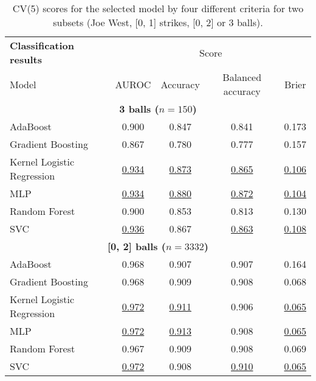 \begin{table}
\centering\small
\begin{tabular}{lcccc}
\toprule
\multicolumn{1}{l}{\textbf{Classification results}}
 & \multicolumn{4}{c}{Score}\\\cmidrule(l){2-5}
Model &  AUROC &  Accuracy &  Balanced accuracy &  Brier \\
\midrule
\multicolumn{5}{c}{\textbf{3 balls ($n=150$)}}\\\addlinespace
AdaBoost 					&  0.900 &     0.847 &              0.841 & 0.173 \\
Gradient Boosting 			&  0.867 &     0.780 &              0.777 & 0.157 \\
Kernel Logistic Regression 	&  \underline{0.934} &     \underline{0.873} &              \underline{0.865} & \underline{0.106} \\
MLP 							&  \underline{0.934} &     \underline{0.880} &              \underline{0.872} & \underline{0.104} \\
Random Forest 				&  0.900 &     0.853 &              0.813 & 0.130 \\
SVC 							&  \underline{0.936} &     0.867 &              \underline{0.863} & \underline{0.108} \\
\midrule
\multicolumn{5}{c}{\textbf{{[0, 2]} balls ($n=3332$)}}\\\addlinespace
AdaBoost						&  {0.968} &     0.907 &              0.907 & 0.164 \\
Gradient Boosting 			&  {0.968} &     0.909 &              0.908 & 0.068 \\
Kernel Logistic Regression 	&  \underline{0.972} &     \underline{0.911} &              0.906 & \underline{0.065} \\
MLP 							&  \underline{0.972} &     \underline{0.913} &              0.908 & \underline{0.065} \\
Random Forest 				&  {0.967} &     0.909 &              0.908 & 0.069 \\
SVC 							&  \underline{0.972} &     0.908 &              \underline{0.910} & \underline{0.065} \\
\bottomrule
\end{tabular}
\vspace{1.5mm}
\caption{CV(5) scores for the selected model by four different criteria for two subsets (Joe West, {[0, 1]} strikes, {[0, 2]} or 3 balls).}
\label{tab:classification.cv_results}
\end{table}